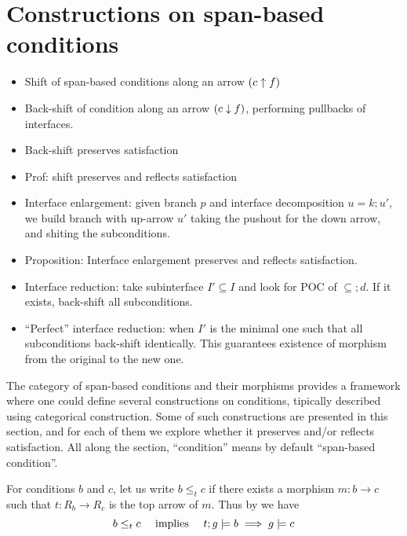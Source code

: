 \section{Constructions on span-based conditions}



\begin{itemize}
  \item Shift of span-based conditions along an arrow $(c\uparrow f)$
  \item Back-shift of condition along an arrow $(c\downarrow f)$, performing pullbacks of interfaces. 
  \item Back-shift preserves satisfaction 
  \item Prof: shift preserves and reflects satisfaction
  \item Interface enlargement: given  branch $p$ and interface decomposition $u = k;u'$, we build branch with up-arrow $u'$ taking the pushout for the down arrow, and shiting the subconditions.
  \item Proposition: Interface enlargement preserves and reflects satisfaction.
  \item Interface reduction: take subinterface $I' \subseteq I$ and look for POC of $\subseteq ; d$. If it exists, back-shift all subconditions. 
  \item ``Perfect'' interface reduction: when $I'$ is the minimal one such that all subconditions back-shift identically. This guarantees existence of morphism from the original to the new one. 
\end{itemize}  

The category of span-based conditions and their morphisms provides a framework 
where one could define several constructions on conditions, tipically described using categorical construction. Some of such constructions are presented in this section, and for each of them we explore whether it preserves and/or reflects satisfaction. All along the section, ``condition'' means by default ``span-based condition''. 

For conditions $b$ and $c$, let us write $b \leq_t c$ if there exists a morphism $m: b \to c$ such that $t: R_b \to R_c$  is the top arrow of $m$. Thus by  we have
\begin{equation}
    \label{eq:morphPresSat}
    b \leq_t c \quad \mbox{  implies  }\quad  t;g \models b \implies g \models c
\end{equation} 

